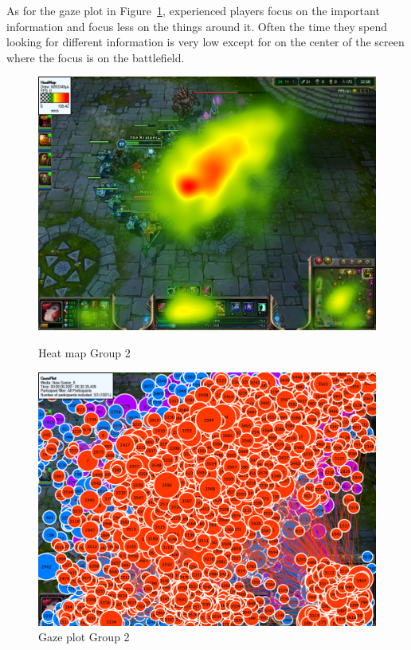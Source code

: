\documentclass[notitlepage]{report}
\begin{document}
As for the gaze plot in Figure~\ref{gaze_pro}, experienced players focus on the important information and focus less on the things around it. Often the time they spend looking for different information is very low except for on the center of the screen where the focus is on the battlefield.

\begin{figure}[!ht]
\begin{minipage}[b]{0.45\linewidth}
\centering
\includegraphics[width=\textwidth]{images/heatmap/Pros}
\caption{Heat map Group 2}
\label{heat_pro}
\end{minipage}
\hspace{0.5cm}
\begin{minipage}[b]{0.45\linewidth}
\centering
\includegraphics[width=\textwidth]{images/gazeplot/Pros}
\caption{Gaze plot Group 2}
\label{gaze_pro}
\end{minipage}
\end{figure}
\end{document}
